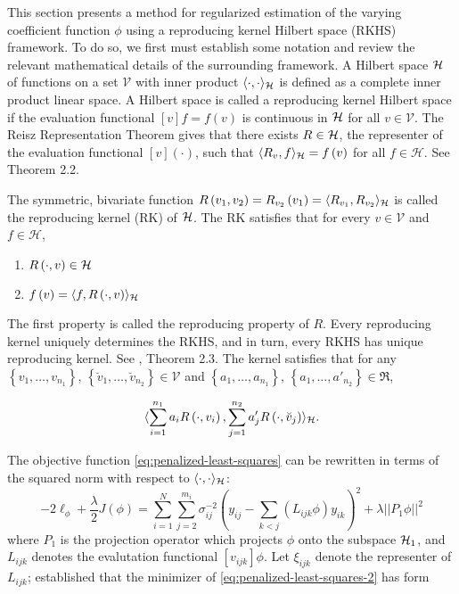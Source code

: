 This section presents a method for regularized estimation of the varying coefficient function $\phi$ using a reproducing kernel Hilbert space (RKHS) framework. To do so, we first must establish some notation and review the relevant mathematical details of the surrounding framework. A Hilbert space $\mathcal{H}$ of functions on a set $\mathcal{V}$ with inner product $\langle \cdot, \cdot\rangle_{\mathcal{H}}$ is defined as a complete inner product linear space. A Hilbert space is called a reproducing kernel Hilbert space if the evaluation functional $\left[v\right]f = f\left(v\right)$ is continuous in $\mathcal{H}$ for all $v \in \mathcal{V}$. The Reisz Representation Theorem gives that there exists $R \in \mathcal{H}$, the representer of the evaluation functional $\left[v\right]\left(\cdot\right)$, such that $\langle R_v, f \rangle_{\mathcal{H}} = f\left(v\right)$ for all $f \in \mathcal{H}$. See \citet{gu2013smoothing} Theorem 2.2.

\bigskip

The symmetric, bivariate function $R\left(v_1, v_2 \right) = R_{v_2 }\left(v_1\right) = \langle R_{v_1}, R_{v_2} \rangle_{\mathcal{H}}$ is called the reproducing kernel (RK) of $\mathcal{H}$. The RK satisfies that for every $v \in \mathcal{V}$ and $f \in \mathcal{H}$,

\begin{enumerate}
\item $R\left(\cdot, v \right) \in \mathcal{H}$ 
\item $f\left(v\right) = \langle f, R\left(\cdot, v\right)\rangle_{\mathcal{H}}$\label{rkhs-reproducing-property}
\end{enumerate}
\noindent
The first property is called the reproducing property of $R$. Every reproducing kernel uniquely determines the RKHS, and in turn, every RKHS has unique reproducing kernel. See \citet{gu2013smoothing}, Theorem 2.3. The kernel satisfies that for any $\left\{v_1,\dots, v_{n_1}\right\}$, $\left\{\breve{v}_1,\dots, \breve{v}_{n_2}\right\} \in \mathcal{V}$ and $\left\{a_1,\dots, a_{n_1}\right\}$, $\left\{a_1,\dots, a'_{n_2}\right\} \in \Re$,

\begin{equation}
 \langle\sum_{i = 1}^{n_1} a_i R\left(\cdot, v_i\right), \sum_{j = 1}^{n_2} a'_j R\left(\cdot, \breve{v}_j\right) \rangle_{\mathcal{H}}.
\end{equation}

The objective function \ref{eq:penalized-least-squares} can be rewritten in terms of the squared norm with respect to $\langle\cdot,\cdot\rangle_{\mathcal{H}}$:
\begin{equation} \label{eq:penalized-least-squares-2}
-2\ell_\phi + \frac{\lambda}{2} J\left(\phi\right) = \sum_{i=1}^N \sum_{j=2}^{m_i} \sigma^{-2}_{ij}\left( y_{ij} - \sum_{k<j}\left( L_{ijk}\phi\right) y_{ik}  \right)^2 + \lambda \vert\vert P_1 \phi \vert \vert^2
\end{equation}
\noindent
where $P_1$ is the projection operator which projects $\phi$ onto the subspace $\mathcal{H}_1$, and $L_{ijk}$ denotes the evalutation functional $\left[v_{ijk}\right] \phi$. Let $\xi_{ijk}$ denote the representer of $L_{ijk}$; \citet{kimeldorf1971some} established that the minimizer of \ref{eq:penalized-least-squares-2} has form

